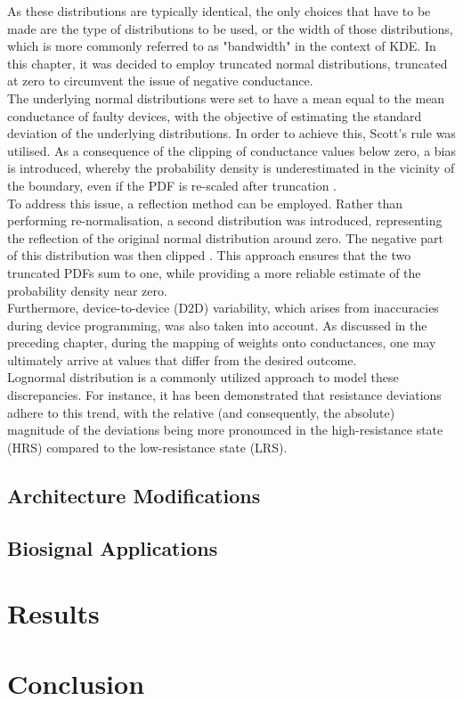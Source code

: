 \noindent As these distributions are typically identical, the only choices that have to be made are the type of distributions to be used, or the width of those distributions, which is more commonly referred to as "bandwidth" \cite{turlach1993bandwidth} in the context of KDE. In this chapter, it was decided to employ truncated normal distributions, truncated at zero to circumvent the issue of negative conductance. \\

\noindent The underlying normal distributions were set to have a mean equal to the mean conductance of faulty devices, with the objective of estimating the standard deviation of the underlying distributions. In order to achieve this, Scott's rule \cite{scott2015multivariate} was utilised. As a consequence of the clipping of conductance values below zero, a bias is introduced, whereby the probability density is underestimated in the vicinity of the boundary, even if the PDF is re-scaled after truncation \cite{silverman2018density}. \\

\noindent To address this issue, a reflection method can be employed. Rather than performing re-normalisation, a second distribution was introduced, representing the reflection of the original normal distribution around zero. The negative part of this distribution was then clipped \cite{jones1993simple}. This approach ensures that the two truncated PDFs sum to one, while providing a more reliable estimate of the probability density near zero.\\

\noindent Furthermore, device-to-device (D2D) variability, which arises from inaccuracies during device programming, was also taken into account. As discussed in the preceding chapter, during the mapping of weights onto conductances, one may ultimately arrive at values that differ from the desired outcome. \\

\noindent Lognormal distribution is a commonly utilized approach to model these discrepancies. For instance, it has been demonstrated that resistance deviations adhere to this trend, with the relative (and consequently, the absolute) magnitude of the deviations being more pronounced in the high-resistance state (HRS) compared to the low-resistance state (LRS).

\subsection{Architecture Modifications}

\subsection{Biosignal Applications}

\section[Results]{Results}

\section[Conclusion]{Conclusion}
